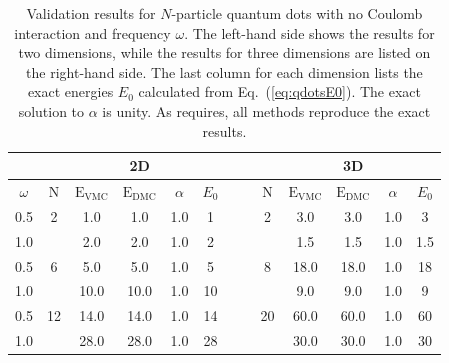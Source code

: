 \setlength{\tabcolsep}{0.3cm}
\begin{table}[h]
\begin{center}
\begin{tabular}{c|cccccc||cccccc}
 & & & 2D & & & & & & & 3D \\
\hline
  $\omega$   & N & $\mathrm{E_{VMC}}$ & $\mathrm{E_{DMC}}$ & $\alpha$ & $E_0$ & \qquad  & \qquad &  N   & $\mathrm{E_{VMC}}$ & $\mathrm{E_{DMC}}$ & $\alpha$ & $E_0$ \\
\hline
 0.5 &   2   &   1.0    &   1.0    &   1.0    & 1  & \qquad & \qquad & 2     &   3.0   &   3.0    &   1.0    & 3 \\
 1.0 &       &   2.0    &   2.0    &   1.0    & 2  & \qquad & \qquad &       &   1.5   &   1.5    &   1.0    & 1.5 \\
 0.5 &   6   &   5.0    &   5.0    &   1.0    & 5  & \qquad & \qquad &  8    &   18.0  &   18.0   &   1.0    & 18 \\
 1.0 &       &   10.0   &   10.0   &   1.0    & 10 & \qquad & \qquad &       &  9.0    &   9.0    &   1.0    & 9 \\
 0.5 &   12  &   14.0   &   14.0   &   1.0    & 14 & \qquad & \qquad & 20    &  60.0   &   60.0   &   1.0    & 60 \\
 1.0 &       &   28.0   &   28.0   &   1.0    & 28 & \qquad & \qquad &       &  30.0   &   30.0   &   1.0    & 30 \\
\end{tabular}
\caption{Validation results for $N$-particle quantum dots with no Coulomb interaction and frequency $\omega$. The left-hand side shows the results for two dimensions, while the results for three dimensions are listed on the right-hand side. The last column for each dimension lists the exact energies $E_0$ calculated from Eq.~(\ref{eq:qdotsE0}). The exact solution to $\alpha$ is unity. As requires, all methods reproduce the exact results.}
\label{tab:res_valid_qdots}
\end{center}
\end{table}
\setlength{\tabcolsep}{6pt}

